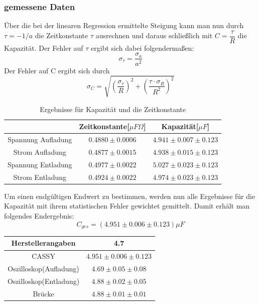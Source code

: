 \documentclass[12pt,a4paper]{article}
\begin{document}
\subsubsection{gemessene Daten}
Über die bei der linearen Regression ermittelte Steigung kann man nun durch $\tau = -1/a$ die Zeitkonstante $\tau$ ausrechnen und daraus schließlich mit $C=\dfrac{\tau}{R}$ die Kapazität.
Der Fehler auf $\tau$ ergibt sich dabei folgendermaßen:
\begin{equation}
\sigma_{\tau}=\dfrac{\sigma_{a}}{a^{2}}
\end{equation}
Der Fehler auf C ergibt sich durch
\begin{equation}
\sigma_C = \sqrt{(\dfrac{\sigma_{\tau}}{R})^{2}+(\dfrac{\tau \cdot \sigma_{R}}{R^{2}})^{2}}
\end{equation}
\begin{table}[H]
\begin{tabular}{|c|c|c|}
\hline 
 & Zeitkonstante[$ \mu F\Omega$] & Kapazität[$ \mu F$] \\ 
\hline 
Spannung Aufladung & $0.4880\pm0.0006$ & $4.941\pm0.007\pm0.123$ \\ 
\hline 
Strom Aufladung & $0.4877\pm0.0015$ & $4.938\pm0.015\pm0.123$ \\ 
\hline 
Spannung Entladung & $0.4977\pm0.0022$ & $5.027\pm0.023\pm0.123$ \\ 
\hline 
Strom Entladung & $0.4924\pm0.0022$ & $4.974\pm0.023\pm0.123$ \\ 
\hline 
\end{tabular}
\caption{Ergebnisse für Kapazität und die Zeitkonstante}
\end{table}

Um einen endgültigen Endwert zu bestimmen, werden nun alle Ergebnisse für die Kapazität mit ihrem statistischen Fehler gewichtet gemittelt. Damit erhält man folgendes Endergebnis:
\begin{equation}
C_{ges} = (4.951\pm 0.006\pm0.123)\mu F
\end{equation}

\begin{tabular}{|c|c|}
\hline 
Herstellerangaben & 4.7\\ 
\hline 
CASSY & $4.951\pm 0.006\pm0.123$\\
\hline 
Oszilloskop(Aufladung) & $4.69\pm 0.05\pm 0.08$ \\ 
\hline 
Oszilloskop(Entladung) & $4.88\pm 0.02\pm 0.05$ \\ 
\hline 
Brücke & $4.88\pm0.01\pm0.01$ \\ 
\hline 
\end{tabular} 
\end{document}
